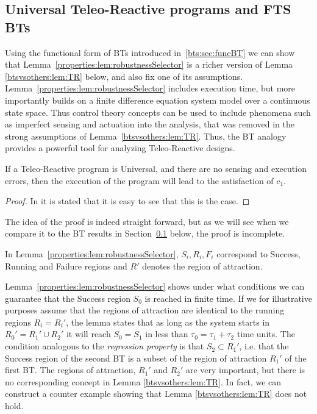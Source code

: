 \subsection{Universal Teleo-Reactive programs and FTS BTs}
\label{btsvsothers:sec:analogyTRs2}
Using the functional form of BTs introduced in~\ref{bts:sec:funcBT} we can show that Lemma~\ref{properties:lem:robustnessSelector} is a richer version of Lemma \ref{btsvsothers:lem:TR} below, and also fix one of its assumptions. Lemma~\ref{properties:lem:robustnessSelector} includes execution time, but more importantly builds on a finite difference equation system model over a continuous state space.
Thus control theory concepts can be used to include phenomena such as imperfect sensing and actuation into the analysis, that was
removed in the strong assumptions of Lemma~\ref{btsvsothers:lem:TR}.
Thus, the BT analogy provides a powerful tool for analyzing Teleo-Reactive designs.

\begin{lemma}[Nilsson 1994]
\label{btsvsothers:lem:TR}
 If a Teleo-Reactive program is Universal, and there are no sensing and execution errors, then the execution of the program will lead to
 the satisfaction of $c_1$.
\end{lemma}
\begin{proof}
In \cite{nilsson1994teleo} it is stated that it is easy to see that this is the case.
\end{proof}

The idea of the proof is indeed straight forward, but as we will see when we compare it to the BT results in Section~\ref{btsvsothers:sec:analogyTRs2} below, the proof is incomplete.

In Lemma~\ref{properties:lem:robustnessSelector},  $S_i,R_i,F_i$ correspond to Success, Running and Failure regions and $R'$ denotes the region of attraction.

Lemma~\ref{properties:lem:robustnessSelector} shows under what conditions we can guarantee that the Success region $S_0$ is reached in finite time.
If we for illustrative purposes assume that the regions of attraction are identical to the running regions $R_i=R_i'$,
the lemma states that as long as the system starts in $R_0'= R_1' \cup R_2'$ it will reach $S_0=S_1$ in less than $\tau_0=\tau_1+\tau_2$
time units. The condition analogous to the \emph{regression property} is that $S_2 \subset  R_1'$, i.e. that the Success region of the second BT
is a subset of the region of attraction $R_1'$ of the first BT. The regions of attraction, $R_1'$ and $R_2'$ are very important,
but  there is no corresponding concept in Lemma  \ref{btsvsothers:lem:TR}. 
In fact, we can construct a counter example showing that Lemma  \ref{btsvsothers:lem:TR} does not hold.



